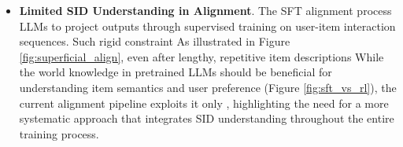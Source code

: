 \begin{itemize}[leftmargin=*]
    \label{llmmatter}
    \item \textbf{Limited SID Understanding in Alignment}.
    The SFT alignment process  LLMs to project outputs  through supervised training on user-item interaction sequences. 
    Such rigid constraint 
    As illustrated in Figure \ref{fig:superficial_align}, even after  lengthy, repetitive item descriptions 
    While the world knowledge in pretrained LLMs should be beneficial for understanding item semantics and user preference (\cf Figure \ref{fig:sft_vs_rl}), the current alignment pipeline exploits it only , highlighting the need for a more systematic approach that integrates SID understanding throughout the entire training process.


\end{itemize}
